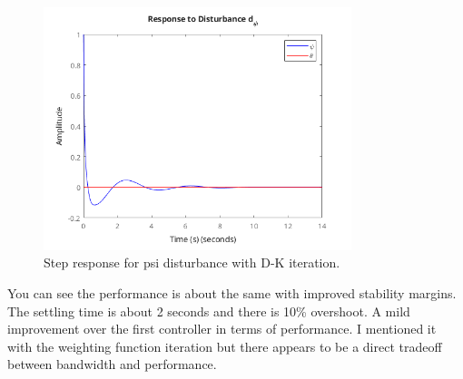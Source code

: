 \documentclass{article}
\begin{document}
\begin{figure}[H]
    \centering
    \includegraphics[width=0.8\textwidth]{stepDpsiDK.png}
    \caption{Step response for psi disturbance with D-K iteration.}
    \label{fig:stepDpsiDK}
\end{figure}

You can see the performance is about the same with improved stability margins.
The settling time is about 2 seconds and there is 10\% overshoot.
A mild improvement over the first controller in terms of performance.
I mentioned it with the weighting function iteration but there appears to be a direct tradeoff between bandwidth and performance.
\end{document}
